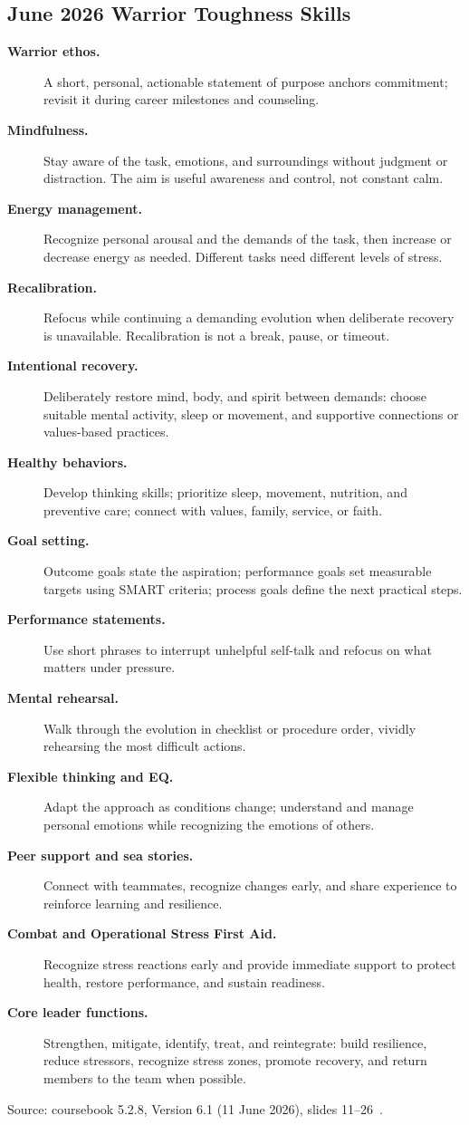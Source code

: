 \documentclass[../main.tex]{subfiles}
\begin{document}
\subsection{June 2026 Warrior Toughness Skills}
\begin{description}
  \item[\textbf{Warrior ethos.}] A short, personal, actionable statement of purpose anchors commitment; revisit it during career milestones and counseling.
  \item[\textbf{Mindfulness.}] Stay aware of the task, emotions, and surroundings without judgment or distraction. The aim is useful awareness and control, not constant calm.
  \item[\textbf{Energy management.}] Recognize personal arousal and the demands of the task, then increase or decrease energy as needed. Different tasks need different levels of stress.
  \item[\textbf{Recalibration.}] Refocus while continuing a demanding evolution when deliberate recovery is unavailable. Recalibration is not a break, pause, or timeout.
  \item[\textbf{Intentional recovery.}] Deliberately restore mind, body, and spirit between demands: choose suitable mental activity, sleep or movement, and supportive connections or values-based practices.
  \item[\textbf{Healthy behaviors.}] Develop thinking skills; prioritize sleep, movement, nutrition, and preventive care; connect with values, family, service, or faith.
  \item[\textbf{Goal setting.}] Outcome goals state the aspiration; performance goals set measurable targets using SMART criteria; process goals define the next practical steps.
  \item[\textbf{Performance statements.}] Use short phrases to interrupt unhelpful self-talk and refocus on what matters under pressure.
  \item[\textbf{Mental rehearsal.}] Walk through the evolution in checklist or procedure order, vividly rehearsing the most difficult actions.
  \item[\textbf{Flexible thinking and EQ.}] Adapt the approach as conditions change; understand and manage personal emotions while recognizing the emotions of others.
  \item[\textbf{Peer support and sea stories.}] Connect with teammates, recognize changes early, and share experience to reinforce learning and resilience.
  \item[\textbf{Combat and Operational Stress First Aid.}] Recognize stress reactions early and provide immediate support to protect health, restore performance, and sustain readiness.
  \item[\textbf{Core leader functions.}] Strengthen, mitigate, identify, treat, and reintegrate: build resilience, reduce stressors, recognize stress zones, promote recovery, and return members to the team when possible.
\end{description}
\noindent Source: coursebook 5.2.8, Version 6.1 (11 June 2026), slides 11--26~\autocite{edo-5-2-8-warrior-toughness-2025}.
\end{document}
